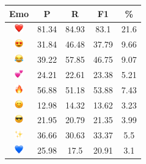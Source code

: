 \documentclass{article}
\begin{document}
\begin{table}
\centering
\begin{tabular}{|c|ccc|c|} \hline
\textbf{Emo} & \textbf{P} & \textbf{R} & \textbf{F1} & \textbf{\%} \\ \hline
\includegraphics[height=0.37cm,width=0.37cm]{img/red_heart.png} & 81.34 & 84.93 & 83.1 & 21.6\\ 
\includegraphics[height=0.37cm,width=0.37cm]{img/smiling_face_with_hearteyes.png} & 31.84 & 46.48 & 37.79 & 9.66\\ 
\includegraphics[height=0.37cm,width=0.37cm]{img/face_with_tears_of_joy.png} & 39.22 & 57.85 & 46.75 & 9.07\\ 
\includegraphics[height=0.37cm,width=0.37cm]{img/two_hearts.png} & 24.21 & 22.61 & 23.38 & 5.21\\ 
\includegraphics[height=0.37cm,width=0.37cm]{img/fire.png} & 56.88 & 51.18 & 53.88 & 7.43\\ 
\includegraphics[height=0.37cm,width=0.37cm]{img/smiling_face_with_smiling_eyes.png} & 12.98 & 14.32 & 13.62 & 3.23\\ 
\includegraphics[height=0.37cm,width=0.37cm]{img/smiling_face_with_sunglasses.png} & 21.95 & 20.79 & 21.35 & 3.99\\ 
\includegraphics[height=0.37cm,width=0.37cm]{img/sparkles.png} & 36.66 & 30.63 & 33.37 & 5.5\\ 
\includegraphics[height=0.37cm,width=0.37cm]{img/blue_heart.png} & 25.98 & 17.5 & 20.91 & 3.1\\ 

\end{tabular}
\end{table}
\end{document}
